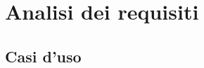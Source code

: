 \chapter{Analisi dei requisiti}\label{chapter:formattazione}
\section{Casi d'uso}\label{sec:cap_sec_subsec}


